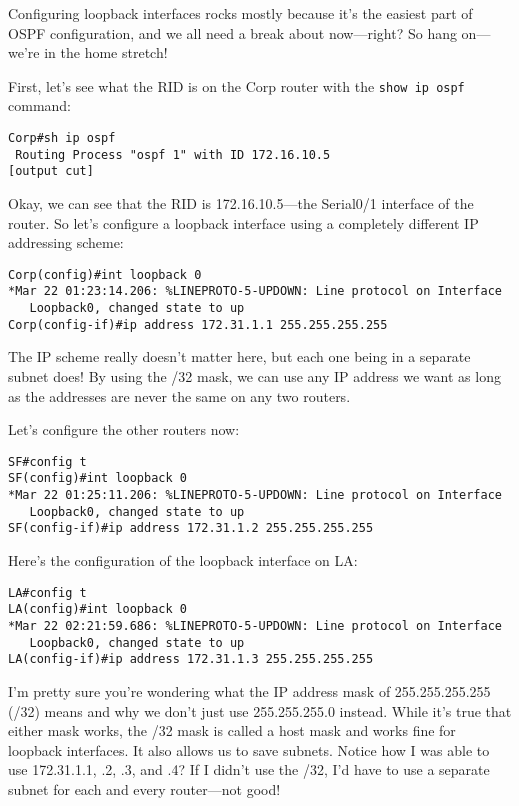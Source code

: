Configuring loopback interfaces rocks mostly because it's the easiest
part of OSPF configuration, and we all need a break about now---right?
So hang on---we're in the home stretch!

First, let's see what the RID is on the Corp router with the
\texttt{show\ ip\ ospf} command:

\begin{verbatim}
Corp#sh ip ospf
 Routing Process "ospf 1" with ID 172.16.10.5
[output cut]
\end{verbatim}

Okay, we can see that the RID is 172.16.10.5---the Serial0/1 interface
of the router. So let's configure a loopback interface using a
completely different IP addressing scheme:

\begin{verbatim}
Corp(config)#int loopback 0
*Mar 22 01:23:14.206: %LINEPROTO-5-UPDOWN: Line protocol on Interface
   Loopback0, changed state to up
Corp(config-if)#ip address 172.31.1.1 255.255.255.255
\end{verbatim}

The IP scheme really doesn't matter here, but each one being in a
separate subnet does! By using the /32 mask, we can use any IP address
we want as long as the addresses are never the same on any two routers.

Let's configure the other routers now:

\begin{verbatim}
SF#config t
SF(config)#int loopback 0
*Mar 22 01:25:11.206: %LINEPROTO-5-UPDOWN: Line protocol on Interface
   Loopback0, changed state to up
SF(config-if)#ip address 172.31.1.2 255.255.255.255
\end{verbatim}

Here's the configuration of the loopback interface on LA:

\begin{verbatim}
LA#config t
LA(config)#int loopback 0
*Mar 22 02:21:59.686: %LINEPROTO-5-UPDOWN: Line protocol on Interface
   Loopback0, changed state to up
LA(config-if)#ip address 172.31.1.3 255.255.255.255
\end{verbatim}

I'm pretty sure you're wondering what the IP address mask of
255.255.255.255 (/32) means and why we don't just use 255.255.255.0
instead. While it's true that either mask works, the /32 mask is called
a host mask and works fine for loopback interfaces. It also allows us to
save subnets. Notice how I was able to use 172.31.1.1, .2, .3, and .4?
If I didn't use the /32, I'd have to use a separate subnet for each and
every router---not good!

